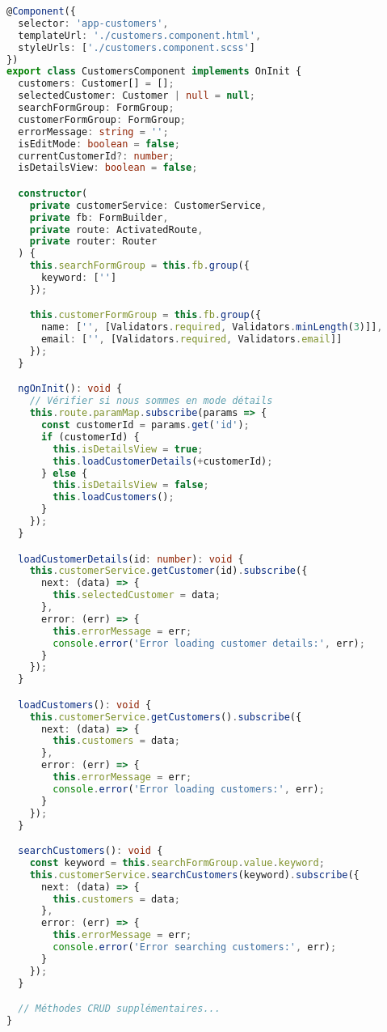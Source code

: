 \documentclass[12pt,a4paper]{report}
\begin{document}
\begin{lstlisting}[language=TypeScript, caption=customers.component.ts]
@Component({
  selector: 'app-customers',
  templateUrl: './customers.component.html',
  styleUrls: ['./customers.component.scss']
})
export class CustomersComponent implements OnInit {
  customers: Customer[] = [];
  selectedCustomer: Customer | null = null;
  searchFormGroup: FormGroup;
  customerFormGroup: FormGroup;
  errorMessage: string = '';
  isEditMode: boolean = false;
  currentCustomerId?: number;
  isDetailsView: boolean = false;

  constructor(
    private customerService: CustomerService,
    private fb: FormBuilder,
    private route: ActivatedRoute,
    private router: Router
  ) {
    this.searchFormGroup = this.fb.group({
      keyword: ['']
    });

    this.customerFormGroup = this.fb.group({
      name: ['', [Validators.required, Validators.minLength(3)]],
      email: ['', [Validators.required, Validators.email]]
    });
  }

  ngOnInit(): void {
    // Vérifier si nous sommes en mode détails
    this.route.paramMap.subscribe(params => {
      const customerId = params.get('id');
      if (customerId) {
        this.isDetailsView = true;
        this.loadCustomerDetails(+customerId);
      } else {
        this.isDetailsView = false;
        this.loadCustomers();
      }
    });
  }

  loadCustomerDetails(id: number): void {
    this.customerService.getCustomer(id).subscribe({
      next: (data) => {
        this.selectedCustomer = data;
      },
      error: (err) => {
        this.errorMessage = err;
        console.error('Error loading customer details:', err);
      }
    });
  }

  loadCustomers(): void {
    this.customerService.getCustomers().subscribe({
      next: (data) => {
        this.customers = data;
      },
      error: (err) => {
        this.errorMessage = err;
        console.error('Error loading customers:', err);
      }
    });
  }

  searchCustomers(): void {
    const keyword = this.searchFormGroup.value.keyword;
    this.customerService.searchCustomers(keyword).subscribe({
      next: (data) => {
        this.customers = data;
      },
      error: (err) => {
        this.errorMessage = err;
        console.error('Error searching customers:', err);
      }
    });
  }

  // Méthodes CRUD supplémentaires...
}
\end{lstlisting}
\end{document}
